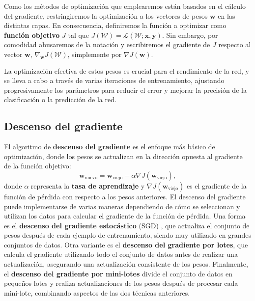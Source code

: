 Como los métodos de optimización que emplearemos están basados en el cálculo del gradiente, restringiremos la optimización a los vectores de pesos \(\mathbf{w}\) en las distintas capas. En consecuencia, definiremos la función a optimizar como \textbf{función objetivo} \(J\) tal que \(J(\mathcal{W}) = \mathcal{L}(\mathcal{W};\mathbf{x}, \mathbf{y})\). Sin embargo, por comodidad abusaremos de la notación y escribiremos el gradiente de \(J\) respecto al vector \(\mathbf{w}\), \(\nabla_{\mathbf{w}} J(\mathcal{W})\), simplemente por \(\nabla J(\mathbf{w})\).

La optimización efectiva de estos pesos es crucial para el rendimiento de la red, y se lleva a cabo a través de varias iteraciones de entrenamiento, ajustando progresivamente los parámetros para reducir el error y mejorar la precisión de la clasificación o la predicción de la red.

\subsection{Descenso del gradiente}

El algoritmo de \textbf{descenso del gradiente} \cite{cauchy1847methode} es el enfoque más básico de optimización, donde los pesos se actualizan en la dirección opuesta al gradiente de la función objetivo:
\begin{equation}
	\mathbf{w}_{\text{nuevo}} = \mathbf{w}_{\text{viejo}} - \alpha \nabla J (\mathbf{w}_{\text{viejo}}),
\end{equation}
donde \(\alpha\) representa la \textbf{tasa de aprendizaje} y \(\nabla J (\mathbf{w}_{\text{viejo}})\) es el gradiente de la función de pérdida con respecto a los pesos anteriores. El descenso del gradiente puede implementarse de varias maneras dependiendo de cómo se seleccionan y utilizan los datos para calcular el gradiente de la función de pérdida. Una forma es el \textbf{descenso del gradiente estocástico} (SGD) \cite{10.1214/aoms/1177729392}, que actualiza el conjunto de pesos después de cada ejemplo de entrenamiento, siendo muy utilizado en grandes conjuntos de datos. Otra variante es el \textbf{descenso del gradiente por lotes}, que calcula el gradiente utilizando todo el conjunto de datos antes de realizar una actualización, asegurando una actualización consistente de los pesos. Finalmente, el \textbf{descenso del gradiente por mini-lotes} divide el conjunto de datos en pequeños lotes y realiza actualizaciones de los pesos después de procesar cada mini-lote, combinando aspectos de las dos técnicas anteriores.

